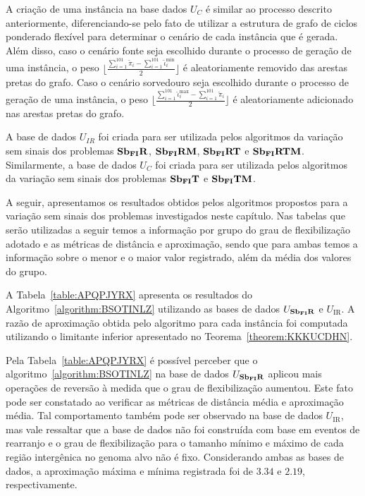 A criação de uma instância na base dados $U_{C}$ é similar ao processo descrito anteriormente, diferenciando-se pelo fato de utilizar a estrutura de grafo de ciclos ponderado flexível para determinar o cenário de cada instância que é gerada. Além disso, caso o cenário fonte seja escolhido durante o processo de geração de uma instância, o peso $\lfloor\frac{\sum_{i = 1}^{101}\breve\pi_i - \sum_{i = 1}^{101}\breve\iota^{\min}_i}{2}\rfloor$ é aleatoriamente removido das arestas pretas do grafo. Caso o cenário sorvedouro seja escolhido durante o processo de geração de uma instância, o peso $\lfloor\frac{\sum_{i = 1}^{101}\breve\iota^{\max}_i - \sum_{i = 1}^{101}\breve\pi_i}{2}\rfloor$ é aleatoriamente adicionado nas arestas pretas do grafo. 

A base de dados $U_{IR}$ foi criada para ser utilizada pelos algoritmos da variação sem sinais dos problemas $\textbf{Sb\textsubscript{FI}R}{}$, $\textbf{Sb\textsubscript{FI}RM}{}$, $\textbf{Sb\textsubscript{FI}RT}{}$ e $\textbf{Sb\textsubscript{FI}RTM}{}$. Similarmente, a base de dados $U_{C}$ foi criada para ser utilizada pelos algoritmos da variação sem sinais dos problemas $\textbf{Sb\textsubscript{FI}T}{}$ e $\textbf{Sb\textsubscript{FI}TM}{}$.

A seguir, apresentamos os resultados obtidos pelos algoritmos propostos para a variação sem sinais dos problemas investigados neste capítulo. Nas tabelas que serão utilizadas a seguir temos a informação por grupo do grau de flexibilização adotado e as métricas de distância e aproximação, sendo que para ambas temos a informação sobre o menor e o maior valor registrado, além da média dos valores do grupo.

A Tabela~\ref{table:APQPJYRX} apresenta os resultados do Algoritmo~\ref{algorithm:BSOTINLZ} utilizando as bases de dados $U_{\textbf{Sb\textsubscript{FI}R}}{}$ e $U_{\text{IR}}$. A razão de aproximação obtida pelo algoritmo para cada instância foi computada utilizando o limitante inferior apresentado no Teorema~\ref{theorem:KKKUCDHN}.



Pela Tabela~\ref{table:APQPJYRX} é possível perceber que o algoritmo~\ref{algorithm:BSOTINLZ} na base de dados $U_{\textbf{Sb\textsubscript{FI}R}}{}$ aplicou mais operações de reversão à medida que o grau de flexibilização aumentou. Este fato pode ser constatado ao verificar as métricas de distância média e aproximação média. Tal comportamento também pode ser observado na base de dados $U_{\text{IR}}$, mas vale ressaltar que a base de dados não foi construída com base em eventos de rearranjo e o grau de flexibilização para o tamanho mínimo e máximo de cada região intergênica no genoma alvo não é fixo. Considerando ambas as bases de dados, a aproximação máxima e mínima registrada foi de $3.34$ e $2.19$, respectivamente.

